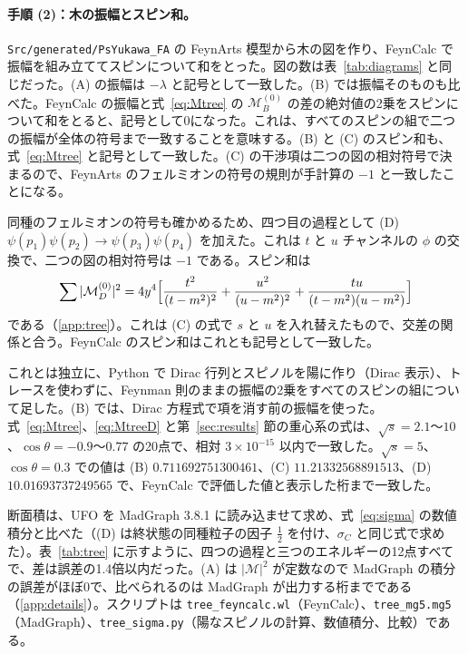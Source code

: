 \documentclass[a4paper,10pt]{ltjsarticle}
\begin{document}
\paragraph{手順 (2)：木の振幅とスピン和。}\texttt{Src/generated/PsYukawa\_FA} の FeynArts 模型から木の図を作り、FeynCalc で振幅を組み立ててスピンについて和をとった。図の数は表~\ref{tab:diagrams} と同じだった。(A) の振幅は $-\lambda$ と記号として一致した。(B) では振幅そのものも比べた。FeynCalc の振幅と式~\eqref{eq:Mtree} の $\mathcal M_B^{(0)}$ の差の絶対値の2乗をスピンについて和をとると、記号として0になった。これは、すべてのスピンの組で二つの振幅が全体の符号まで一致することを意味する。(B) と (C) のスピン和も、式~\eqref{eq:Mtree} と記号として一致した。(C) の干渉項は二つの図の相対符号で決まるので、FeynArts のフェルミオンの符号の規則が手計算の $-1$ と一致したことになる。

同種のフェルミオンの符号も確かめるため、四つ目の過程として (D) $\psi(p_1)\psi(p_2)\to\psi(p_3)\psi(p_4)$ を加えた。これは $t$ と $u$ チャンネルの $\phi$ の交換で、二つの図の相対符号は $-1$ である。スピン和は
\begin{equation}
\sum|\mathcal M_D^{(0)}|^2=4y^4\Bigl[\frac{t^2}{(t-m^2)^2}+\frac{u^2}{(u-m^2)^2}+\frac{tu}{(t-m^2)(u-m^2)}\Bigr]
\label{eq:MtreeD}
\end{equation}
である（\ref{app:tree}）。これは (C) の式で $s$ と $u$ を入れ替えたもので、交差の関係と合う。FeynCalc のスピン和はこれとも記号として一致した。

これとは独立に、Python で Dirac 行列とスピノルを陽に作り（Dirac 表示）、トレースを使わずに、Feynman 則のままの振幅の2乗をすべてのスピンの組について足した。(B) では、Dirac 方程式で項を消す前の振幅を使った。式~\eqref{eq:Mtree}、\eqref{eq:MtreeD} と第~\ref{sec:results} 節の重心系の式は、$\sqrt s=2.1$〜$10$、$\cos\theta=-0.9$〜$0.77$ の20点で、相対 $3\times10^{-15}$ 以内で一致した。$\sqrt s=5$、$\cos\theta=0.3$ での値は (B) $0.711692751300461$、(C) $11.21332568891513$、(D) $10.01693737249565$ で、FeynCalc で評価した値と表示した桁まで一致した。

断面積は、UFO を MadGraph 3.8.1 に読み込ませて求め、式~\eqref{eq:sigma} の数値積分と比べた（(D) は終状態の同種粒子の因子 $\frac12$ を付け、$\sigma_C$ と同じ式で求めた）。表~\ref{tab:tree} に示すように、四つの過程と三つのエネルギーの12点すべてで、差は誤差の1.4倍以内だった。(A) は $|\mathcal M|^2$ が定数なので MadGraph の積分の誤差がほぼ0で、比べられるのは MadGraph が出力する桁までである（\ref{app:details}）。スクリプトは \texttt{tree\_feyncalc.wl}（FeynCalc）、\texttt{tree\_mg5.mg5}（MadGraph）、\texttt{tree\_sigma.py}（陽なスピノルの計算、数値積分、比較）である。
\end{document}
